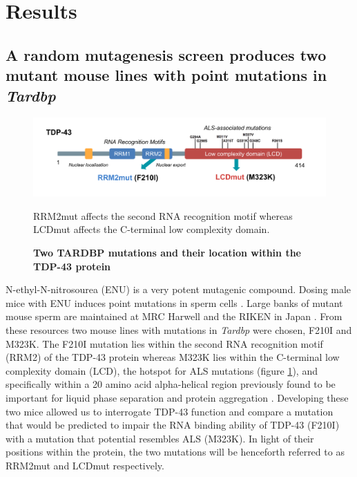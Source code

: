 \section{Results}

\subsection{A random mutagenesis screen produces two mutant mouse lines with point mutations in \textit{Tardbp}}

\begin{figure}[h!]
	\centering
	\includegraphics[scale=0.6]{Figures/05_tdp_mice/TDP_structure_mutations.png}
	\caption{\textbf{Two TARDBP mutations and their location within the TDP-43 protein}}
	RRM2mut affects the second RNA recognition motif whereas LCDmut affects the C-terminal low complexity domain.
	\label{fig:tdp_structure}
\end{figure}

N-ethyl-N-nitrosourea (ENU) is a very potent mutagenic compound. Dosing male mice with ENU induces point mutations in sperm cells \citep{DeAngelis2000}. Large banks of mutant mouse sperm are maintained at MRC Harwell \citep{Acevedo2008} and the RIKEN in Japan \citep{Gondo2010}. From these resources two mouse lines with mutations in \textit{Tardbp} were chosen, F210I and M323K. The F210I mutation lies within the second RNA recognition motif (RRM2) of the TDP-43 protein whereas M323K lies within the C-terminal low complexity domain (LCD), the hotspot for ALS mutations (figure \ref{fig:tdp_structure}), and specifically within a 20 amino acid alpha-helical region previously found to be important for liquid phase separation and protein aggregation \citep{Conicella2016}. Developing these two mice allowed us to interrogate TDP-43 function and compare a mutation that would be predicted to impair the RNA binding ability of TDP-43 (F210I) with a mutation that potential resembles ALS (M323K). In light of their positions within the protein, the two mutations will be henceforth referred to as RRM2mut and LCDmut respectively.


